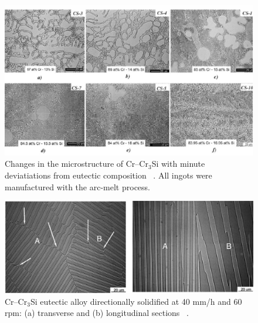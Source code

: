 %
\begin{figure}[H]
\begin{center}
\includegraphics[width=16cm]{ireallylovewill}
\caption{Changes in the microstructure of Cr--Cr$_3$Si with minute deviatiations from eutectic composition ~\cite{bei03a}.  All ingots were manufactured with the arc-melt process.}
\label{fig:CrCr3Si _micros}
\end{center}
\end{figure}
%
%
\begin{figure}
\begin{center}
\includegraphics[width=16cm]{DS_Cr-Cr3Si}
\caption{Cr--Cr$_3$Si eutectic alloy directionally solidified at 40 mm/h and 60 rpm: (a) transverse and (b) longitudinal sections ~\cite{bei03}.}
\label{fig:DS_CrCr3Si}
\end{center}
\end{figure}
%

